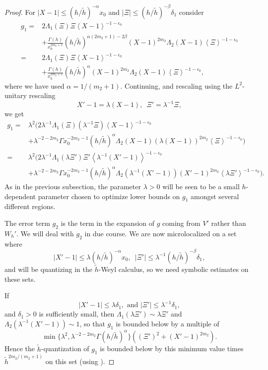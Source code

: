 \documentclass[twoside, final]{amsart}
\theoremstyle{definition}
\numberwithin{equation}{section}
\begin{document}
\begin{proof}
 For $|X-1| {\leqslant} (h/{\tilde{h}})^{-\alpha} x_0$ and $|
\Xi | {\leqslant} (h / {\tilde{h}} )^{-\beta} \delta_1$ consider 
\begin{align*}
g_1 
= & 2\Lambda_1(\Xi) \Xi {{\left\langle{{X-1}}\right\rangle}}^{-1-{{\epsilon}}_0} \\
& + 
\frac{\Gamma(h)}{x_0^{2m_2+1}}  (h/{\tilde{h}})^{\alpha(2m_2+1) - 2 \beta}
(X-1)^{2m_2}\Lambda_2(X-1){{\left\langle{{\Xi}}\right\rangle}}^{-1-{{\epsilon}}_0} \\
= & 2\Lambda_1(\Xi) \Xi {{\left\langle{{X-1}}\right\rangle}}^{-1-{{\epsilon}}_0} \\
& + 
\frac{\Gamma(h)}{x_0^{2m_2+1}}  (h/{\tilde{h}})^{\alpha}
(X-1)^{2m_2}\Lambda_2(X-1){{\left\langle{{\Xi}}\right\rangle}}^{-1-{{\epsilon}}_0} ,
\end{align*}
where we have used $\alpha = 1/(m_2 + 1)$.  Continuing, and rescaling using the $L^2$-unitary rescaling
\[
X' -1= \lambda (X-1), \,\,\, \Xi' = \lambda^{-1}\Xi,
\]
we get 
\begin{align*}
g_1
= & \lambda^2 \Big( 2\lambda^{-1}\Lambda_1 ( \Xi ) (\lambda^{-1}\Xi )
  {{\left\langle{{X-1}}\right\rangle}}^{-1-{{\epsilon}}_0} \\
& +  \lambda^{-2-2m_2} \Gamma x_0^{-2m_2-1} (h/{\tilde{h}})^{\alpha} \Lambda_2 (X-1) ( \lambda (X-1))^{2m_2} {{\left\langle{{\Xi}}\right\rangle}}^{-1-{{\epsilon}}_0} \Big) \\
= & \lambda^2 \Big( 2 \lambda^{-1}\Lambda_1( \lambda \Xi') \Xi' {{\left\langle{{
    \lambda^{-1} (X'-1) }}\right\rangle}}^{-1-{{\epsilon}}_0} \\
& + \lambda^{-2-2m_2} \Gamma x_0^{-2m_2-1} (h/{\tilde{h}})^{\alpha} \Lambda_2
  (\lambda^{-1}(X'-1)) (X'-1)^{2m_2} {{\left\langle{{ \lambda \Xi' }}\right\rangle}}^{-1-{{\epsilon}}_0} \Big) .
\end{align*}
As in the previous subsection, the parameter $\lambda>0$ will be seen
to be a small $h$-dependent parameter chosen to optimize lower bounds
on $g_1$ amongst several different regions.

The error term $g_2$ is the term in the expansion of $g$ coming
from $V'$ rather than $W_h'$.  We will deal with $g_2$ in due course.  
We are now microlocalized on a set where
\[
| X' -1| {\leqslant} \lambda (h/{\tilde{h}})^{-\alpha} x_0, \,\,\, | \Xi' | {\leqslant} \lambda^{-1} (h/{\tilde{h}})^{-\beta} \delta_1,
\]
and will be quantizing in the ${\tilde{h}}$-Weyl calculus, so we need symbolic
estimates on these sets.  

If 
\[
| X'-1| {\leqslant} \lambda\delta_1, \text{ and } | \Xi' | {\leqslant} \lambda^{-1} \delta_1,
\]
and $\delta_1>0$ is sufficiently small, 
then $\Lambda_1( \lambda \Xi') \sim \lambda \Xi'$ and
$\Lambda_2(\lambda^{-1}( X'-1)  ) \sim 1$, so
that $g_1$ is bounded below by a multiple of
\begin{equation}
\min \{  \lambda^2,  \lambda^{-2-2m_2} \Gamma (h/{\tilde{h}})^{\alpha} \} (
(\Xi')^2 + (X'-1)^{2m_2} ). \label{E:g11-1}
\end{equation}
Hence the ${\tilde{h}}$-quantization of $g_1$ is bounded below by this minimum
value 
times 
${\tilde{h}}^{2m_2/(m_2 +1)}$ on this set (using \cite[Lemma A.2]{ChWu-lsm}).


\end{proof}
\end{document}
